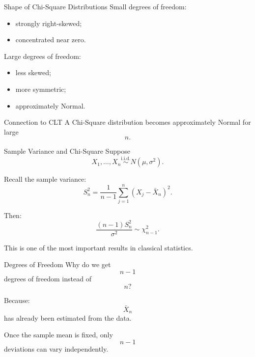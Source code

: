 \begin{frame}{Shape of Chi-Square Distributions}
Small degrees of freedom:
\begin{itemize}
    \item strongly right-skewed;
    \item concentrated near zero.
\end{itemize}

\vspace{0.25cm}

Large degrees of freedom:
\begin{itemize}
    \item less skewed;
    \item more symmetric;
    \item approximately Normal.
\end{itemize}

\vspace{0.25cm}

\begin{keybox}{Connection to CLT}
A Chi-Square distribution becomes approximately Normal for large
\[
n.
\]
\end{keybox}
\end{frame}

\begin{frame}{Sample Variance and Chi-Square}
Suppose
\[
X_1,\dots,X_n
\overset{\text{i.i.d.}}{\sim}
N(\mu,\sigma^2).
\]

Recall the sample variance:
\[
S_n^2
=
\frac1{n-1}
\sum_{j=1}^n
(X_j-\bar X_n)^2.
\]

Then:
\[
\boxed{
\frac{
(n-1)S_n^2
}{
\sigma^2
}
\sim
\chi_{n-1}^2.
}
\]

\vspace{0.25cm}

This is one of the most important results in classical statistics.
\end{frame}

\begin{frame}{Degrees of Freedom}
Why do we get
\[
n-1
\]
degrees of freedom instead of
\[
n?
\]

\vspace{0.25cm}

Because:
\[
\bar X_n
\]
has already been estimated from the data.

\vspace{0.25cm}

Once the sample mean is fixed,
only
\[
n-1
\]
deviations can vary independently.
\end{frame}

